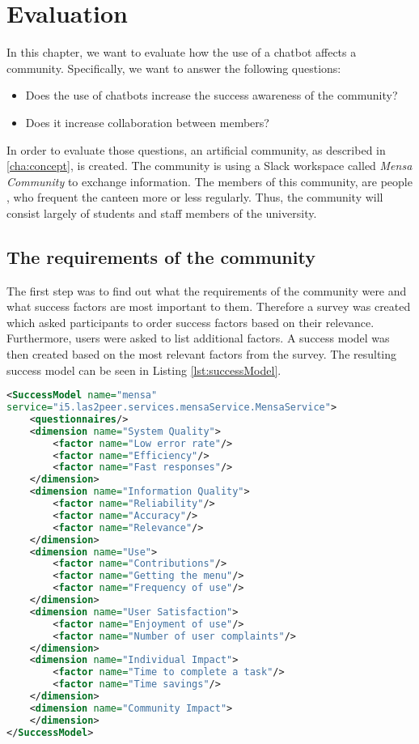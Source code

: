 \chapter{Evaluation}\label{cha:eval}
In this chapter, we want to evaluate how the use of a chatbot affects a community.
Specifically, we want to answer the following questions:
\begin{itemize}
    \item Does the use of chatbots increase the success awareness of the community?
    \item Does it increase collaboration between members?
\end{itemize}

In order to evaluate those questions, an artificial community, as described in \ref{cha:concept}, is created.  
The community is using a Slack workspace called \emph{Mensa Community} to exchange information.
The members of this community, are people , who frequent the canteen more or less regularly.
Thus, the community will consist largely of students and staff members of the university.

\section{The requirements of the community}
The first step was to find out what the requirements of the community were and what success factors are most important to them. Therefore a survey was created which asked participants to order success factors based on their relevance. 
Furthermore, users were asked to list additional factors.
A success model was then created based on the most relevant factors from the survey. The resulting success model can be seen in Listing \ref{lst:successModel}.

\begin{lstlisting}[language=XML,caption=Success Model based on requirements, label=lst:successModel]
<SuccessModel name="mensa" 
service="i5.las2peer.services.mensaService.MensaService">
    <questionnaires/>
    <dimension name="System Quality">
        <factor name="Low error rate"/>
        <factor name="Efficiency"/>
        <factor name="Fast responses"/>
    </dimension>
    <dimension name="Information Quality">
        <factor name="Reliability"/>
        <factor name="Accuracy"/>
        <factor name="Relevance"/>
    </dimension>
    <dimension name="Use">
        <factor name="Contributions"/>
        <factor name="Getting the menu"/>
        <factor name="Frequency of use"/>
    </dimension>
    <dimension name="User Satisfaction">
        <factor name="Enjoyment of use"/>
        <factor name="Number of user complaints"/>
    </dimension>
    <dimension name="Individual Impact">
        <factor name="Time to complete a task"/>
        <factor name="Time savings"/>
    </dimension>
    <dimension name="Community Impact">
    </dimension>
</SuccessModel>
\end{lstlisting}

